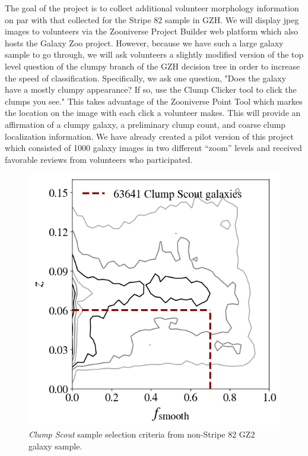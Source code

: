 The goal of the project is to collect additional volunteer morphology information on par with that collected for the Stripe 82 sample in GZH. We will display jpeg images to volunteers via the Zooniverse Project Builder web platform which also hosts the Galaxy Zoo project.  However,  because we have such a large galaxy sample to go through, we will ask volunteers a slightly modified version of the top level question of the clumpy branch of the GZH decision tree in order to increase the speed of classification. Specifically, we ask one question, "Does the galaxy have a mostly clumpy appearance? If so, use the Clump Clicker tool to click the clumps you see." This takes advantage of the Zooniverse Point Tool which markes the location on the image with each click a volunteer makes. This will provide an affirmation of a clumpy galaxy, a preliminary clump count, and coarse clump localization information. We have already created a pilot version of this project which consisted of 1000 galaxy images in two different ``zoom'' levels and received favorable reviews from volunteers who participated. 

\begin{figure}
\centering
\includegraphics[width=5in]{Figures/clump_scout_sample_in_z-fsmooth.png}
\caption[\textit{Clump Scout} sample selection criteria from non-Stripe 82 GZ2 galaxy sample.]{\textit{Clump Scout} sample selection criteria from non-Stripe 82 GZ2 galaxy sample.}
\label{fig: clump scout sample}
\end{figure}



